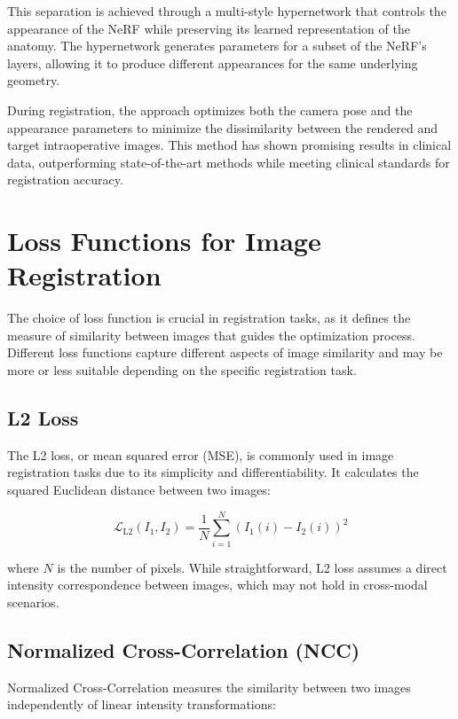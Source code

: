 This separation is achieved through a multi-style hypernetwork that controls the appearance of the NeRF while preserving its learned representation of the anatomy. The hypernetwork generates parameters for a subset of the NeRF's layers, allowing it to produce different appearances for the same underlying geometry.

During registration, the approach optimizes both the camera pose and the appearance parameters to minimize the dissimilarity between the rendered and target intraoperative images. This method has shown promising results in clinical data, outperforming state-of-the-art methods while meeting clinical standards for registration accuracy.

\section{Loss Functions for Image Registration}

The choice of loss function is crucial in registration tasks, as it defines the measure of similarity between images that guides the optimization process. Different loss functions capture different aspects of image similarity and may be more or less suitable depending on the specific registration task.

\subsection{L2 Loss}

The L2 loss, or mean squared error (MSE), is commonly used in image registration tasks due to its simplicity and differentiability. It calculates the squared Euclidean distance between two images:

\begin{equation}
    \mathcal{L}_{\text{L2}}(I_1, I_2) = \frac{1}{N} \sum_{i=1}^{N} (I_1(i) - I_2(i))^2
\end{equation}

where $N$ is the number of pixels. While straightforward, L2 loss assumes a direct intensity correspondence between images, which may not hold in cross-modal scenarios.

\subsection{Normalized Cross-Correlation (NCC)}

Normalized Cross-Correlation measures the similarity between two images independently of linear intensity transformations:

